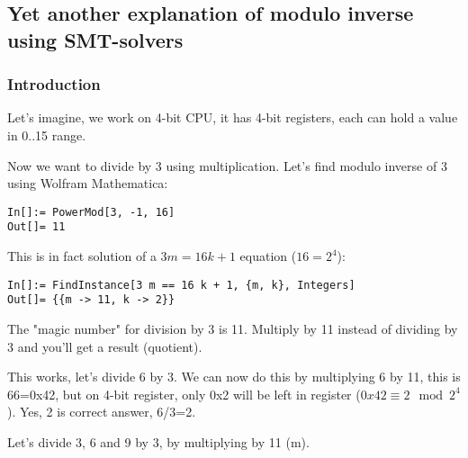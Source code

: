 \subsection{Yet another explanation of modulo inverse using SMT-solvers}

\subsubsection{Introduction}

Let's imagine, we work on 4-bit CPU, it has 4-bit registers, each can hold a value in 0..15 range.

Now we want to divide by 3 using multiplication.
Let's find modulo inverse of 3 using Wolfram Mathematica:

\begin{lstlisting}
In[]:= PowerMod[3, -1, 16]
Out[]= 11
\end{lstlisting}

This is in fact solution of a $3m=16k+1$ equation ($16 = 2^4$):

\begin{lstlisting}
In[]:= FindInstance[3 m == 16 k + 1, {m, k}, Integers]
Out[]= {{m -> 11, k -> 2}}
\end{lstlisting}

The "magic number" for division by 3 is 11. Multiply by 11 instead of dividing by 3 and you'll get a result (quotient).

This works, let's divide 6 by 3. We can now do this by multiplying 6 by 11, this is 66=0x42, but on 4-bit register, only 0x2 will be left in register ($0x42 \equiv 2 \mod 2^4$).
Yes, 2 is correct answer, 6/3=2.

Let's divide 3, 6 and 9 by 3, by multiplying by 11 (m).

\iffalse
\begin{lstlisting}[basicstyle=\tiny]
           |123456789abcdef0|123456789abcdef0|123456789abcdef0|123456789abcdef0|123456789abcdef0|123456789abcdef0|123456789abcdef0|
    m=11   |***********     |                |                |                |                |                |                |
3/3 3m=33  |****************|****************|*               |                |                |                |                |
6/3 6m=66  |****************|****************|****************|****************|**              |                |                |
9/3 9m=99  |****************|****************|****************|****************|****************|****************|***             |
\end{lstlisting}
\fi


